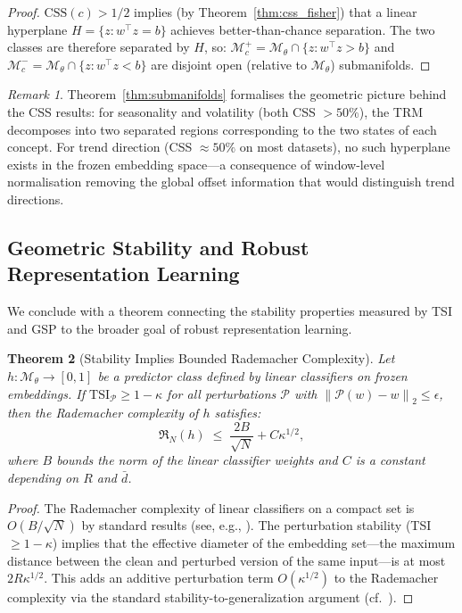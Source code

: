 \documentclass[12pt]{article}
\newtheorem{theorem}{Theorem}[section]
\theoremstyle{definition}
\theoremstyle{remark}
\newtheorem{remark}[theorem]{Remark}
\newcommand{\Mset}{\mathcal{M}}
\newcommand{\Pset}{\mathcal{P}}
\newcommand{\norm}[1]{\left\lVert #1 \right\rVert}
\newcommand{\trm}{\mathcal{M}_\theta}
\newcommand{\tsi}{\mathrm{TSI}}
\newcommand{\css}{\mathrm{CSS}}
\begin{document}
\begin{proof}
$\css(c) > 1/2$ implies (by Theorem~\ref{thm:css_fisher}) that a linear
hyperplane $H = \{z : w^\top z = b\}$ achieves better-than-chance separation.
The two classes are therefore separated by $H$, so:
$\Mset^+_c = \trm \cap \{z : w^\top z > b\}$ and
$\Mset^-_c = \trm \cap \{z : w^\top z < b\}$
are disjoint open (relative to $\trm$) submanifolds.
\end{proof}

\begin{remark}
Theorem~\ref{thm:submanifolds} formalises the geometric picture behind the
CSS results: for seasonality and volatility (both CSS $> 50\%$), the TRM
decomposes into two separated regions corresponding to the two states of each
concept. For trend direction (CSS $\approx 50\%$ on most datasets), no such
hyperplane exists in the frozen embedding space---a consequence of
window-level normalisation removing the global offset information that would
distinguish trend directions.
\end{remark}

\subsection{Geometric Stability and Robust Representation Learning}

We conclude with a theorem connecting the stability properties measured
by TSI and GSP to the broader goal of robust representation learning.

\begin{theorem}[Stability Implies Bounded Rademacher Complexity]
\label{thm:stability_rademacher}
Let $h: \trm \to [0,1]$ be a predictor class defined by linear classifiers
on frozen embeddings. If $\tsi_\Pset \geq 1 - \kappa$ for all perturbations
$\Pset$ with $\norm{\Pset(w) - w}_2 \leq \epsilon$, then the Rademacher
complexity of $h$ satisfies:
\[
  \mathfrak{R}_N(h) \;\leq\; \frac{2B}{\sqrt{N}} + C\kappa^{1/2},
\]
where $B$ bounds the norm of the linear classifier weights and $C$ is a
constant depending on $R$ and $\bar{d}$.
\end{theorem}

\begin{proof}
The Rademacher complexity of linear classifiers on a compact set is
$O(B/\sqrt{N})$ by standard results (see, e.g., \citealt{shalev2014understanding}).
The perturbation stability (TSI $\geq 1-\kappa$) implies that the effective
diameter of the embedding set---the maximum distance between the clean and
perturbed version of the same input---is at most $2R\kappa^{1/2}$.
This adds an additive perturbation term $O(\kappa^{1/2})$ to the Rademacher
complexity via the standard stability-to-generalization argument
(cf.\ \citealt{hardt2016train}).
\end{proof}
\end{document}
